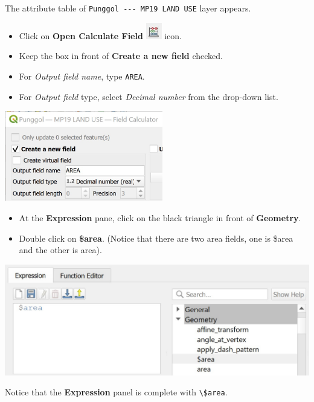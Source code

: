 \documentclass[
  letterpaper,
  DIV=11,
  numbers=noendperiod]{scrreprt}
\begin{document}
The attribute table of \texttt{Punggol\ -\/-\/-\ MP19\ LAND\ USE} layer
appears.

\begin{itemize}
\item
  Click on \textbf{Open Calculate Field}
  \includegraphics[width=0.27083in,height=\textheight]{./img04/image35.jpg}
  icon.
\item
  Keep the box in front of \textbf{Create a new field} checked.
\item
  For \emph{Output field name}, type \texttt{AREA}.
\item
  For \emph{Output field} type, select \emph{Decimal number} from the
  drop-down list.
\end{itemize}

\includegraphics[width=2.71875in,height=\textheight]{./img04/image36.jpg}

\begin{itemize}
\item
  At the \textbf{Expression} pane, click on the black triangle in front
  of \textbf{Geometry}.
\item
  Double click on \textbf{\$area}. (Notice that there are two area
  fields, one is \$area and the other is area).
\end{itemize}

\includegraphics{./img04/image37.jpg}

Notice that the \textbf{Expression} panel is complete with
\texttt{\textbackslash{}\$area}.
\end{document}

